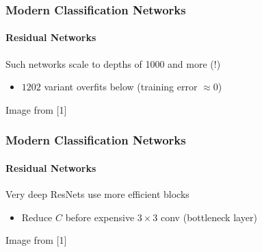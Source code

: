 \documentclass[xetex,professionalfont]{beamer}
\renewcommand\emph[1]{\textcolor{tuwcvl_cvl_blue}{#1}}
\begin{document}
\begin{frame}
	\frametitle{Modern Classification Networks}
	\framesubtitle{Residual Networks}

	Such networks scale to depths of 1000 and more (!)
	\begin{itemize}
		\item $1202$ variant overfits below (training error $\approx0$)
	\end{itemize}

	\medskip

	\begin{center}
		{\centering Image from [1]}
	\end{center}

\end{frame}


\begin{frame}
	\frametitle{Modern Classification Networks}
	\framesubtitle{Residual Networks}

	Very deep ResNets use more efficient blocks
	\begin{itemize}
		\item Reduce $C$ before expensive $3\times3$ conv (\emph{bottleneck layer})
	\end{itemize}

	\medskip

	\begin{center}
		{\centering Image from [1]}
	\end{center}

\end{frame}
\end{document}
